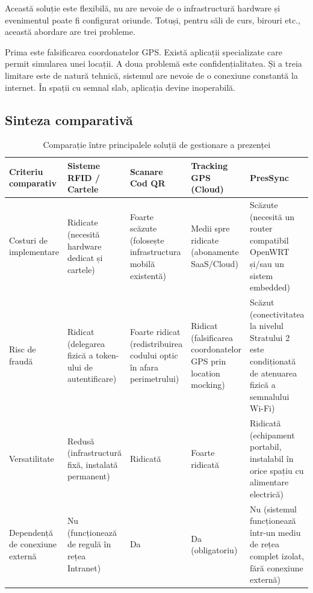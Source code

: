 \documentclass[a4paper,12pt,oneside]{report}
\begin{document}
Această soluție este flexibilă, nu are nevoie de o infrastructură hardware și evenimentul poate fi configurat oriunde. Totuși, pentru săli de curs, birouri etc., această abordare are trei probleme.

Prima este falsificarea coordonatelor GPS. Există aplicații specializate care permit simularea unei locații. A doua problemă este confidențialitatea. Și a treia limitare este de natură tehnică, sistemul are nevoie de o conexiune constantă la internet. În spații cu semnal slab, aplicația devine inoperabilă.
\newpage
\subsection{Sinteza comparativă}

\begin{table}[htbp]
    \centering
    \small
    \setlength{\tabcolsep}{3pt}
    \begin{tabular}{|p{}|p{}|p{}|p{}|p{}|}
        \hline
        \textbf{Criteriu comparativ} & \textbf{Sisteme RFID / Cartele} & \textbf{Scanare Cod QR} & \textbf{Tracking GPS (Cloud)} & \textbf{PresSync} \\
        \hline
        Costuri de implementare & Ridicate (necesită hardware dedicat și cartele) & Foarte scăzute (folosește infrastructura mobilă existentă) & Medii spre ridicate (abonamente SaaS/Cloud) & Scăzute (necesită un router compatibil OpenWRT și/sau un sistem embedded) \\
        \hline
        Risc de fraudă & Ridicat (delegarea fizică a token-ului de autentificare) & Foarte ridicat (redistribuirea codului optic în afara perimetrului) & Ridicat (falsificarea coordonatelor GPS prin location mocking) & Scăzut (conectivitatea la nivelul Stratului 2 este condiționată de atenuarea fizică a semnalului Wi-Fi) \\
        \hline
        Versatilitate & Redusă (infrastructură fixă, instalată permanent) & Ridicată & Foarte ridicată & Ridicată (echipament portabil, instalabil în orice spațiu cu alimentare electrică) \\
        \hline
        Dependență de conexiune externă & Nu (funcționează de regulă în rețea Intranet) & Da & Da (obligatoriu) & Nu (sistemul funcționează într-un mediu de rețea complet izolat, fără conexiune externă) \\
        \hline
    \end{tabular}
    \caption{Comparație între principalele soluții de gestionare a prezenței}
    \label{tab:sinteza-comparativa}
\end{table}
\end{document}
